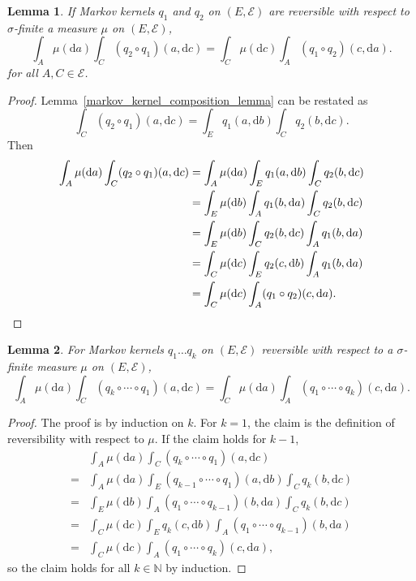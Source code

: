 \documentclass[english,twoside,openright]{HYgraduMLDS}
\newtheorem{lemma}{Lemma}
\newcommand{\N}{\mathbb{N}}
\newcommand{\dx}{\mathrm{d}}
\begin{document}
\begin{lemma}\label{composition_reversible_lemma}
	If Markov kernels \(q_{1}\) and \(q_{2}\) on \((E, \mathcal{E})\)
  are reversible with respect to \(\sigma\)-finite a measure \(\mu\)
  on \((E, \mathcal{E})\),
  \[
    \int_{A}\mu(\dx a)\int_{C}(q_{2}\circ q_{1})(a, \dx c)
    = \int_{C}\mu(\dx c)\int_{A}(q_{1}\circ q_{2})(c, \dx a).
  \]
  for all \(A, C\in \mathcal{E}\).
\end{lemma}
\begin{proof}
  Lemma~\ref{markov_kernel_composition_lemma} can be restated as
  \[
    \int_{C}(q_{2}\circ q_{1})(a, \dx c) = \int_{E}q_{1}(a, \dx b)\int_{C}q_{2}(b, \dx c).
  \]
  Then
	\begin{align*}
    \int_{A}\mu(\dx a)\int_{C}(q_{2}\circ q_{1})(a, \dx c)
    &= \int_{A}\mu(\dx a)\int_{E}q_{1}(a, \dx b)\int_{C}q_{2}(b, \dx c)
    \\&= \int_{E}\mu(\dx b)\int_{A}q_{1}(b, \dx a)\int_{C}q_{2}(b, \dx c)
    \\&= \int_{E}\mu(\dx b)\int_{C}q_{2}(b, \dx c)\int_{A}q_{1}(b, \dx a)
    \\&= \int_{C}\mu(\dx c)\int_{E}q_{2}(c, \dx b)\int_{A}q_{1}(b, \dx a)
    \\&= \int_{C}\mu(\dx c)\int_{A}(q_{1}\circ q_{2})(c, \dx a).
    \qedhere
  \end{align*}
\end{proof}
\begin{lemma}\label{composition_reversible_multiple_lemma}
  For Markov kernels \(q_{1}\dotsc q_{k}\) on \((E, \mathcal{E})\) reversible
  with respect to a \(\sigma\)-finite measure \(\mu\) on \((E, \mathcal{E})\),
  \[
    \int_{A}\mu(\dx a)\int_{C}(q_{k}\circ \dotsb \circ q_{1})(a, \dx c)
    = \int_{C}\mu(\dx a)\int_{A}(q_{1}\circ \dotsb \circ q_{k})(c, \dx a).
  \]
\end{lemma}
\begin{proof}
  The proof is by induction on \(k\). For \(k = 1\), the claim is the definition
  of reversibility with respect to \(\mu\). If the claim holds for \(k - 1\),
  \begin{align*}
    &\int_{A}\mu(\dx a)\int_{C}(q_{k}\circ\dotsb \circ q_{1})(a, \dx c)
    \\=& \int_{A}\mu(\dx a)\int_{E}(q_{k-1}\circ \dotsb \circ q_{1})(a, \dx b)
      \int_{C}q_{k}(b, \dx c)
    \\=& \int_{E}\mu(\dx b)\int_{A}(q_{1}\circ \dotsb \circ q_{k-1})(b, \dx a)
      \int_{C}q_{k}(b, \dx c)
    \\=& \int_{C}\mu(\dx c) \int_{E}q_{k}(c, \dx b)
         \int_{A}(q_{1}\circ \dotsb \circ q_{k-1})(b, \dx a)
    \\=&\int_{C}\mu(\dx c)\int_{A}(q_{1}\circ\dotsb \circ q_{k})(c, \dx a),
  \end{align*}
  so the claim holds for all \(k\in \N\) by induction.

\end{proof}
\end{document}
